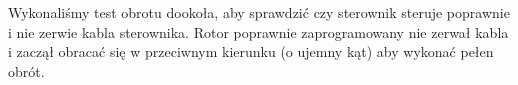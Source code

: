 Wykonaliśmy test obrotu dookoła, aby sprawdzić czy sterownik steruje poprawnie i nie zerwie kabla sterownika. Rotor poprawnie zaprogramowany nie zerwał kabla i zaczął obracać się w przeciwnym kierunku (o ujemny kąt) aby wykonać pełen obrót.
% 
% 
% 
% 
% 
% 
% 


